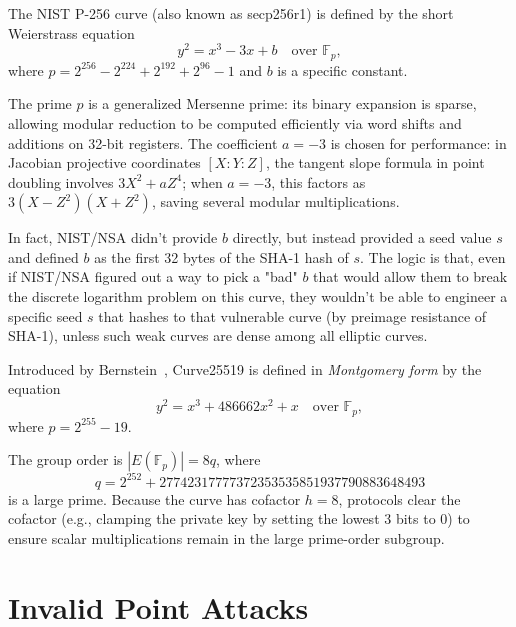 
\begin{example}
    The NIST P-256 curve (also known as secp256r1) is defined by the short Weierstrass equation
    \[
        y^2 = x^3 - 3x + b \quad \text{over } \mathbb{F}_p,
    \]
    where \(p = 2^{256} - 2^{224} + 2^{192} + 2^{96} - 1\) and \(b\) is a specific constant.

    The prime \(p\) is a generalized Mersenne prime: its binary expansion is sparse, allowing modular reduction to be computed efficiently via word shifts and additions on 32-bit registers.
    The coefficient \(a = -3\) is chosen for performance: in Jacobian projective coordinates \([X : Y : Z]\), the tangent slope formula in point doubling involves \(3X^2 + aZ^4\); when \(a = -3\), this factors as \(3(X - Z^2)(X + Z^2)\), saving several modular multiplications.

    In fact, NIST/NSA didn't provide \(b\) directly, but instead provided a seed value \(s\) and defined \(b\) as the first 32 bytes of the SHA-1 hash of \(s\).
    The logic is that, even if NIST/NSA figured out a way to pick a "bad" \(b\) that would allow them to break the discrete logarithm problem on this curve, they wouldn't be able to engineer a specific seed \(s\) that hashes to that vulnerable curve (by preimage resistance of SHA-1), unless such weak curves are dense among all elliptic curves.
\end{example}

\begin{example}[Curve25519]
    Introduced by Bernstein~\cite{Bernstein2006}, Curve25519 is defined in \emph{Montgomery form} by the equation
    \[
        y^2 = x^3 + 486662x^2 + x \quad \text{over } \mathbb{F}_p,
    \]
    where \(p = 2^{255} - 19\).

    The group order is \(|E(\mathbb{F}_p)| = 8q\), where
    \[
        q = 2^{252} + 27742317777372353535851937790883648493
    \]
    is a large prime.
    Because the curve has cofactor \(h = 8\), protocols clear the cofactor (e.g., clamping the private key by setting the lowest 3 bits to 0) to ensure scalar multiplications remain in the large prime-order subgroup.
\end{example}

\section*{Invalid Point Attacks}

